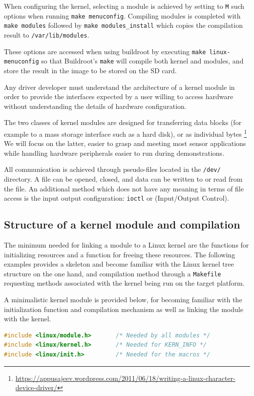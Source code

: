 \documentclass{article}
\begin{document}
{When configuring the kernel, selecting a module is achieved by setting to
{\tt M} such options when running {\tt make menuconfig}. Compiling modules
is completed with {\tt make modules} followed by {\tt make modules\_install} 
which copies the compilation result to {\tt /var/lib/modules}.

These options are accessed when using buildroot by executing {\tt make linux-menuconfig}
so that Buildroot's {\tt make} will compile both kernel and modules, and store the
result in the image to be stored on the SD card.

Any driver developer must understand the architecture of a kernel module in order to
provide the interfaces expected by a user willing to access hardware without understanding
the details of hardware configuration.

The two classes of kernel modules are designed for transferring data blocks (for example
to a mass storage interface such as a hard disk), or as individual bytes
\footnote{\url{https://appusajeev.wordpress.com/2011/06/18/writing-a-linux-character-device-driver/}} 
We will focus on the latter, easier to grasp and meeting most sensor applications while
handling hardware peripherals easier to run during demonstrations.

All communication is achieved through pseudo-files located in the {\tt /dev/} directory.
A file can be opened, closed, and data can be written to or read from the file. An additional
method which does not have any meaning in terms of file access is the input output
configuration: {\tt ioctl} or (Input/Output Control).


\subsection{Structure of a kernel module and compilation}

The minimum needed for linking a module to a Linux kernel are the functions for initializing
resources and a function for freeing these resources. The following examples provides a 
skeleton and become familiar with the Linux kernel tree structure on the one hand, and compilation
method through a {\tt Makefile} requesting methods associated with the kernel being run on the target
platform.

A minimalistic kernel module is provided below, for becoming familiar with the initialization
function and compilation mechanism as well as linking the module with the kernel.

\begin{lstlisting}[language=C,label=code1,caption={First example of kernel module}]
#include <linux/module.h>       /* Needed by all modules */
#include <linux/kernel.h>       /* Needed for KERN_INFO */
#include <linux/init.h>         /* Needed for the macros */


\end{lstlisting}}
\end{document}
